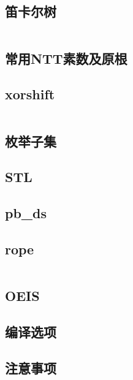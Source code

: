\documentclass[a4paper, twoside]{article}
\begin{document}
\begin{multicols}{2}
			\subsection{笛卡尔树}
				\inputminted{cpp}{../src/misc/笛卡尔树.cpp}
			
			\subsection{常用NTT素数及原根}
				

			\subsection{xorshift}
				\inputminted{cpp}{../src/misc/xorshift.cpp}
			
			\subsection{枚举子集}
				
				
			\subsection{STL}
				

			\subsection{pb\_ds}
				

			\subsection{rope}
				\inputminted{cpp}{../src/misc/rope.cpp}

			\subsection{OEIS}
				
			
			\subsection{编译选项}
				
				
			\subsection{注意事项}


\end{multicols}
\end{document}
